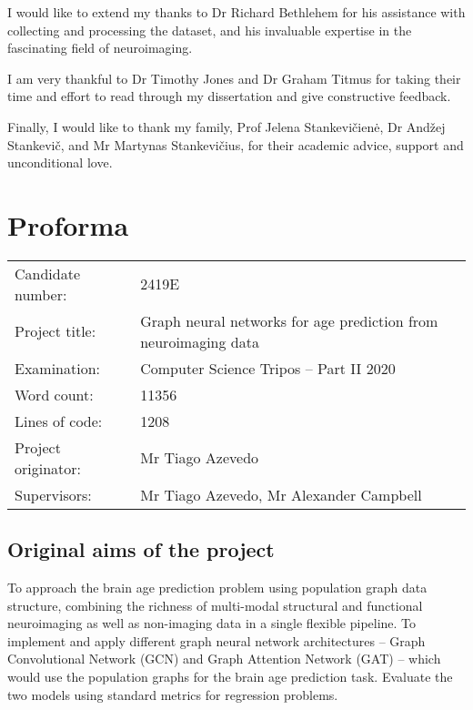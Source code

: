 I would like to extend my thanks to Dr Richard Bethlehem for his assistance with collecting and processing the dataset, and his invaluable expertise in the fascinating field of neuroimaging.

I am very thankful to Dr Timothy Jones and Dr Graham Titmus for taking their time and effort to read through my dissertation and give constructive feedback.

Finally, I would like to thank my family, Prof Jelena Stankevičienė, Dr Andžej Stankevič, and Mr Martynas Stankevičius, for their academic advice, support and unconditional love.


\chapter*{Proforma}

\begin{tabular}{ll}
Candidate number:   & 2419E                  \\
Project title:      & Graph neural networks for age prediction from neuroimaging data \\
Examination:        & Computer Science Tripos -- Part II 2020 \\
Word count:         & 11356\footnotemark[1] \\
Lines of code:      & 1208  \\
Project originator: & Mr Tiago Azevedo                        \\
Supervisors:        & Mr Tiago Azevedo, Mr Alexander Campbell \\ 
\end{tabular}


\section*{Original aims of the project}

To approach the brain age prediction problem using population graph data structure, combining the richness of multi-modal structural and functional neuroimaging as well as non-imaging data in a single flexible pipeline.
To implement and apply different graph neural network architectures – Graph Convolutional Network (GCN) and Graph Attention Network (GAT) – which would use the population graphs for the brain age prediction task. Evaluate the two models using standard metrics for regression problems.

